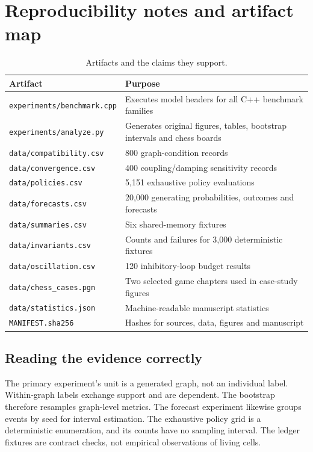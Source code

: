 \documentclass[10pt,a4paper]{article}
\begin{document}
\clearpage
\section*{Reproducibility notes and artifact map}
\begin{table}[htbp]\centering\small
\caption{Artifacts and the claims they support.}\label{tab:artifacts}
\begin{tabular}{p{.35\linewidth}p{.55\linewidth}}\toprule
Artifact & Purpose \\\midrule
\texttt{experiments/benchmark.cpp} & Executes model headers for all C++ benchmark families \\
\texttt{experiments/analyze.py} & Generates original figures, tables, bootstrap intervals and chess boards \\
\texttt{data/compatibility.csv} & 800 graph-condition records \\
\texttt{data/convergence.csv} & 400 coupling/damping sensitivity records \\
\texttt{data/policies.csv} & 5,151 exhaustive policy evaluations \\
\texttt{data/forecasts.csv} & 20,000 generating probabilities, outcomes and forecasts \\
\texttt{data/summaries.csv} & Six shared-memory fixtures \\
\texttt{data/invariants.csv} & Counts and failures for 3,000 deterministic fixtures \\
\texttt{data/oscillation.csv} & 120 inhibitory-loop budget results \\
\texttt{data/chess\_cases.pgn} & Two selected game chapters used in case-study figures \\
\texttt{data/statistics.json} & Machine-readable manuscript statistics \\
\texttt{MANIFEST.sha256} & Hashes for sources, data, figures and manuscript \\\bottomrule
\end{tabular}\end{table}

\subsection*{Reading the evidence correctly}
The primary experiment's unit is a generated graph, not an individual label. Within-graph labels exchange support and are dependent. The bootstrap therefore resamples graph-level metrics. The forecast experiment likewise groups events by seed for interval estimation. The exhaustive policy grid is a deterministic enumeration, and its counts have no sampling interval. The ledger fixtures are contract checks, not empirical observations of living cells.
\end{document}
